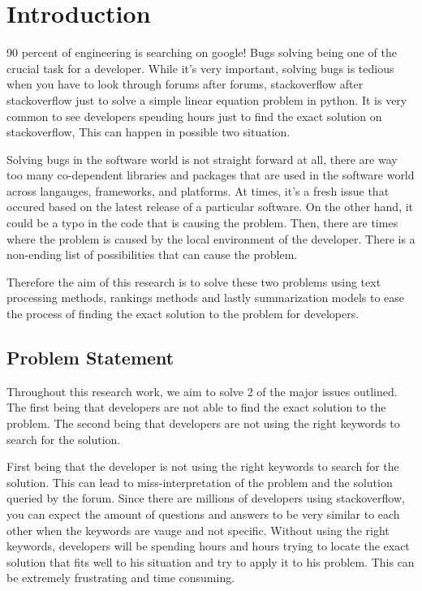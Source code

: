 \chapter{Introduction}
90 percent of engineering is searching on google! Bugs solving being one of the crucial task for a developer. While it's very important, solving bugs is tedious when you have to look through forums after forums, stackoverflow after stackoverflow just to solve a simple linear equation problem in python. It is very common to see developers spending hours just to find the exact solution on stackoverflow, This can happen in possible two situation. 

Solving bugs in the software world is not straight forward at all, there are way too many co-dependent libraries and packages that are used in the software world across langauges, frameworks, and platforms. At times, it's a fresh issue that occured based on the latest release of a particular software. On the other hand, it could be a typo in the code that is causing the problem. Then, there are times where the problem is caused by the local environment of the developer. There is a non-ending list of possibilities that can cause the problem.

Therefore the aim of this research is to solve these two problems using text processing methods, rankings methods and lastly summarization models to ease the process of finding the exact solution to the problem for developers.

\vspace{1cm}
\pagebreak
\section{Problem Statement}
Throughout this research work, we aim to solve 2 of the major issues outlined. The first being that developers are not able to find the exact solution to the problem. The second being that developers are not using the right keywords to search for the solution.

First being that the developer is not using the right keywords to search for the solution. This can lead to miss-interpretation of the problem and the solution queried by the forum. Since there are millions of developers using stackoverflow, you can expect the amount of questions and answers to be very similar to each other when the keywords are vauge and not specific. Without using the right keywords, developers will be spending hours and hours trying to locate the exact solution that fits well to his situation and try to apply it to his problem. This can be extremely frustrating and time consuming.

